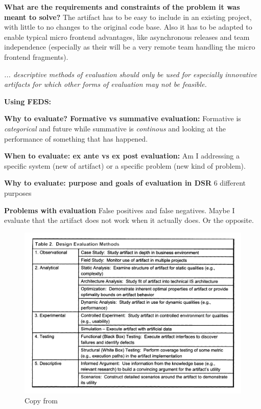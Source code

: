\textbf{What are the requirements and constraints of the problem it was meant to solve?}
The artifact has to be easy to include in an existing project, with little to no changes to the original code base. Also it has to be adapted to enable typical micro frontend advantages, like asynchronous releases and team independence (especially as their will be a very remote team handling the micro frontend fragments).

\textit{... descriptive methods of evaluation should only be used for especially innovative artifacts for which other forms of evaluation may not be feasible.}

\textbf{Using FEDS:}

\textbf{Why to evaluate? Formative vs summative evaluation:} Formative is \textit{categorical} and future while summative is \textit{continous} and looking at the performance of something that has happened.

\textbf{When to evaluate: ex ante vs ex post evaluation:} Am I addressing a specific system (new of artifact) or a specific problem (new kind of problem).

\textbf{Why to evaluate: purpose and goals of evaluation in DSR}
6 different purposes

\textbf{Problems with evaluation}
False positives and false negatives. Maybe I evaluate that the artifact does not work when it actually does. Or the opposite.

\begin{figure}[!ht]
    \centering
    \includegraphics[width=\textwidth]{images/copy-temp.png}
    \caption{Copy from \cite{Hevner2004}}
\end{figure}

